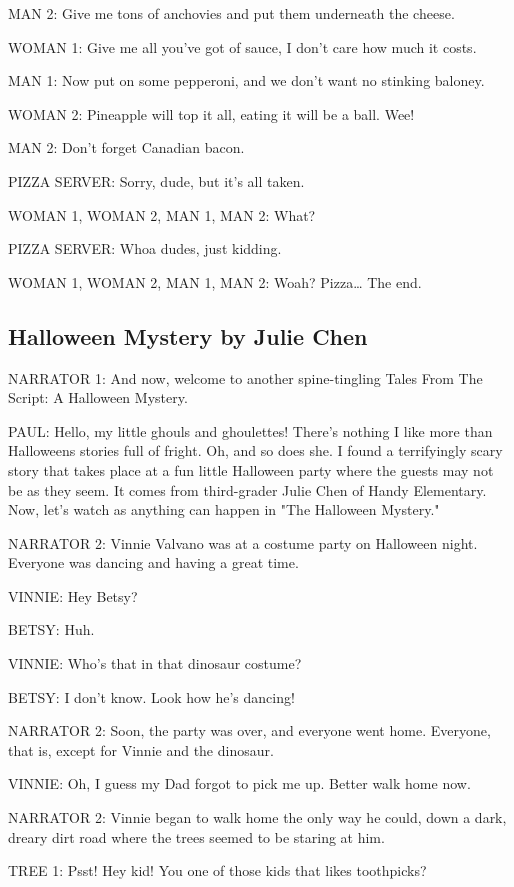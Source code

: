 MAN 2:
Give me tons of anchovies and put them underneath the cheese.

WOMAN 1:
Give me all you've got of sauce, I don't care how much it costs.

MAN 1:
Now put on some pepperoni, and we don't want no stinking baloney.

WOMAN 2:
Pineapple will top it all, eating it will be a ball.
Wee!

MAN 2:
Don't forget Canadian bacon.

PIZZA SERVER:
Sorry, dude, but it's all taken.

WOMAN 1, WOMAN 2, MAN 1, MAN 2:
What?

PIZZA SERVER:
Whoa dudes, just kidding.

WOMAN 1, WOMAN 2, MAN 1, MAN 2:
Woah?
Pizza\dots
The end.

\subsection{Halloween Mystery by Julie Chen}

NARRATOR 1:
And now, welcome to another spine-tingling Tales From The Script: A Halloween Mystery.

PAUL:
Hello, my little ghouls and ghoulettes!
There's nothing I like more than Halloweens stories full of fright.
Oh, and so does she.
I found a terrifyingly scary story that takes place at a fun little Halloween party where the guests may not be as they seem.
It comes from third-grader Julie Chen of Handy Elementary.
Now, let's watch as anything can happen in "The Halloween Mystery."

NARRATOR 2:
Vinnie Valvano was at a costume party on Halloween night.
Everyone was dancing and having a great time.

VINNIE:
Hey Betsy?

BETSY:
Huh.

VINNIE:
Who's that in that dinosaur costume?

BETSY:
I don't know. Look how he's dancing!

NARRATOR 2:
Soon, the party was over, and everyone went home.
Everyone, that is, except for Vinnie and the dinosaur.

VINNIE:
Oh, I guess my Dad forgot to pick me up.
Better walk home now.

NARRATOR 2:
Vinnie began to walk home the only way he could, down a dark, dreary dirt road where the trees seemed to be staring at him.

TREE 1:
Psst!
Hey kid!
You one of those kids that likes toothpicks?

